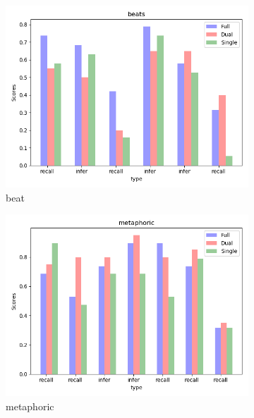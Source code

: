 \documentclass[11pt]{article}
\begin{document}
\begin{figure}[H]
    \centering
    \begin{subfigure}[t]{0.5\textwidth}
        \centering
        \includegraphics[scale=0.5]{beats}
        \caption{beat}
    \end{subfigure}%
    \begin{subfigure}[t]{0.5\textwidth}
        \centering
        \includegraphics[scale=0.5]{meta}
        \caption{metaphoric}
    \end{subfigure}
    \begin{subfigure}[t]{0.5\textwidth}
        \centering

\end{subfigure}
\end{figure}
\end{document}
